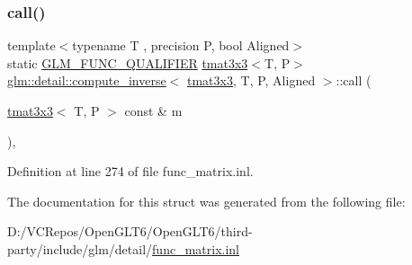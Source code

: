 \subsubsection{\texorpdfstring{call()}{call()}}
{\footnotesize\ttfamily template$<$typename T , precision P, bool Aligned$>$ \\
static \mbox{\hyperlink{setup_8hpp_a33fdea6f91c5f834105f7415e2a64407}{G\+L\+M\+\_\+\+F\+U\+N\+C\+\_\+\+Q\+U\+A\+L\+I\+F\+I\+ER}} \mbox{\hyperlink{structglm_1_1tmat3x3}{tmat3x3}}$<$T, P$>$ \mbox{\hyperlink{structglm_1_1detail_1_1compute__inverse}{glm\+::detail\+::compute\+\_\+inverse}}$<$ \mbox{\hyperlink{structglm_1_1tmat3x3}{tmat3x3}}, T, P, Aligned $>$\+::call (\begin{DoxyParamCaption}\item[{\mbox{\hyperlink{structglm_1_1tmat3x3}{tmat3x3}}$<$ T, P $>$ const \&}]{m }\end{DoxyParamCaption})\hspace{0.3cm}{\ttfamily [inline]}, {\ttfamily [static]}}



Definition at line 274 of file func\+\_\+matrix.\+inl.



The documentation for this struct was generated from the following file\+:\begin{DoxyCompactItemize}
\item 
D\+:/\+V\+C\+Repos/\+Open\+G\+L\+T6/\+Open\+G\+L\+T6/third-\/party/include/glm/detail/\mbox{\hyperlink{func__matrix_8inl}{func\+\_\+matrix.\+inl}}\end{DoxyCompactItemize}
